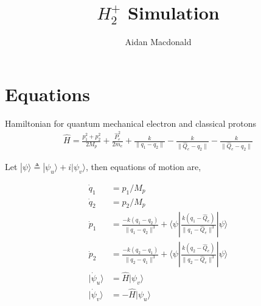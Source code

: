 \documentclass[10pt,a4paper,final]{article}
\author{Aidan Macdonald}
\title{$H_2^+$ Simulation}
\begin{document}
\maketitle

\section{Equations}

Hamiltonian for quantum mechanical electron and classical protons
\begin{align*}
\hat{H} = \frac{p_1^2 + p_2^2}{2 M_p} + \frac{\hat{P}_e^2}{2m_e} + \frac{k}{\| q_1 - q_2 \|} - \frac{k}{\| \hat{Q}_e - q_2 \|} - \frac{k}{\| \hat{Q}_e - q_2 \|}
\end{align*}

Let $ | \psi \rangle \triangleq | \psi_u \rangle + i| \psi_v \rangle $, then equations of motion are,

\begin{align*}
\dot{q}_1 &= p_1/M_p \\
\dot{q}_2 &= p_2/M_p \\
\dot{p}_1 &= \frac{-k(q_1 - q_2)}{\|q_1 - q_2\|^3} + \langle \psi | \frac{k(q_1 - \hat{Q}_e)}{\|q_1 - \hat{Q}_e\|^3} | \psi \rangle \\
\dot{p}_2 &= \frac{-k(q_2 - q_1)}{\|q_2 - q_1\|^3} + \langle \psi | \frac{k(q_2 - \hat{Q}_e)}{\|q_2 - \hat{Q}_e\|^3} | \psi \rangle \\
| \dot{\psi}_u \rangle &= \hat{H} | \psi_v \rangle \\
| \dot{\psi}_v \rangle &= -\hat{H} | \psi_u \rangle \\
\end{align*}
\end{document}
